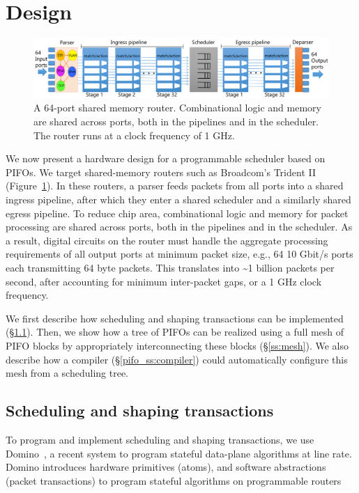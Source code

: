 \section{Design}
\label{s:design}

\begin{figure}
  \centering
  \includegraphics[width=\textwidth]{pifo_router_pipeline.pdf}
  \caption{A 64-port shared memory router.  Combinational logic and memory are
  shared across ports, both in the pipelines and in the scheduler. The router
  runs at a clock frequency of 1 GHz.}
  \label{pifo_fig:router}
\end{figure}

We now present a hardware design for a programmable scheduler based on PIFOs.
We target shared-memory routers such as Broadcom's Trident II~\cite{trident2}
(Figure~\ref{pifo_fig:router}). In these routers, a parser feeds packets from all
ports into a shared ingress pipeline, after which they enter a shared scheduler
and a similarly shared egress pipeline. To reduce chip area, combinational
logic and memory for packet processing are shared across ports, both in the
pipelines and in the scheduler.  As a result, digital circuits on the router
must handle the aggregate processing requirements of all output ports at
minimum packet size, e.g., 64 10 Gbit/s ports each transmitting 64 byte
packets. This translates into \textasciitilde 1 billion packets per second,
after accounting for minimum inter-packet gaps, or a 1 GHz clock
frequency.

We first describe how scheduling and shaping transactions can be implemented
(\S\ref{ss:transactions}). Then, we show how a tree of PIFOs can be realized
using a full mesh of PIFO blocks by appropriately interconnecting these blocks
(\S\ref{ss:mesh}). We also describe how a compiler (\S\ref{pifo_ss:compiler}) could
automatically configure this mesh from a scheduling tree.

\subsection{Scheduling and shaping transactions}
\label{ss:transactions}

To program and implement scheduling and shaping transactions, we use
Domino~\cite{domino_sigcomm}, a recent system to program stateful
data-plane algorithms at line rate. Domino introduces hardware
primitives (atoms), and software abstractions (packet transactions) to
program stateful algorithms on programmable routers~\cite{tofino, flexpipe,
xpliant, rmt}

